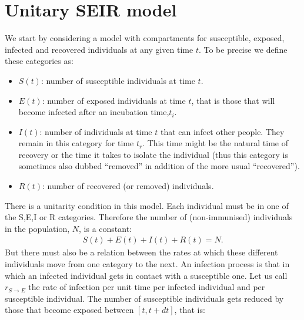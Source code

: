 \documentclass[a4paper,oneside,11pt]{article}
\begin{document}
\section{Unitary SEIR model}
\label{sec:useir}
We start by considering a model with compartments for susceptible, exposed, infected and recovered individuals at any given time $t$. To be precise we define these categories
as:
\begin{itemize}
\item $S(t)$: number of susceptible individuals at time $t$.
\item $E(t)$: number of exposed individuals at time $t$, that is those that will become infected after an incubation time,$t_i$. 
\item $I(t)$: number of individuals at time $t$ that can infect other people. They remain in this category for time $t_r$. This time might be the natural time of recovery or the time it takes to isolate the individual (thus this category is sometimes also dubbed ``removed'' in addition of the more usual ``recovered''). 
\item $R(t)$: number of recovered (or removed) individuals.
\end{itemize}
There is a unitarity condition in this model.  Each individual must be in one of the S,E,I or R categories. Therefore the number of (non-immunised) individuals in the population, $N$, is a constant:
\begin{eqnarray}
S(t)+ E(t)+I(t)+R(t) = N.
\end{eqnarray}
But there must also be a relation between the rates at which these different individuals move from one category to the next. An infection process is that in which an infected individual gets in contact with a susceptible one. Let us call $r_{S\rightarrow E}$ the rate of infection per unit time
per infected individual and per susceptible individual. The number of susceptible individuals gets reduced by those that become exposed between $[t, t+dt]$, that is:
\end{document}
